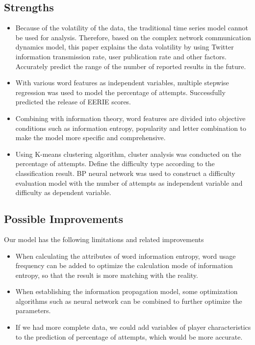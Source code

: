 \documentclass{mcmthesis}
\begin{document}
\subsection{Strengths}
\begin{itemize}
\item Because of the volatility of the data, the traditional time series model cannot be used for analysis. Therefore, based on the complex network communication dynamics model, this paper explains the data volatility by using Twitter information transmission rate, user publication rate and other factors. Accurately predict the range of the number of reported results in the future.
\item With various word features as independent variables, multiple stepwise regression was used to model the percentage of attempts. Successfully predicted the release of EERIE scores.
\item Combining with information theory, word features are divided into objective conditions such as information entropy, popularity and letter combination to make the model more specific and comprehensive.
\item Using K-means clustering algorithm, cluster analysis was conducted on the percentage of attempts. Define the difficulty type according to the classification result. BP neural network was used to construct a difficulty evaluation model with the number of attempts as independent variable and difficulty as dependent variable.
\end{itemize}

\subsection{Possible Improvements}
Our model has the following limitations and related improvements
\begin{itemize}
	\item When calculating the attributes of word information entropy, word usage frequency can be added to optimize the calculation mode of information entropy, so that the result is more matching with the reality.
	\item When establishing the information propagation model, some optimization algorithms such as neural network can be combined to further optimize the parameters.
	\item If we had more complete data, we could add variables of player characteristics to the prediction of percentage of attempts, which would be more accurate.
\end{itemize}
\end{document}
